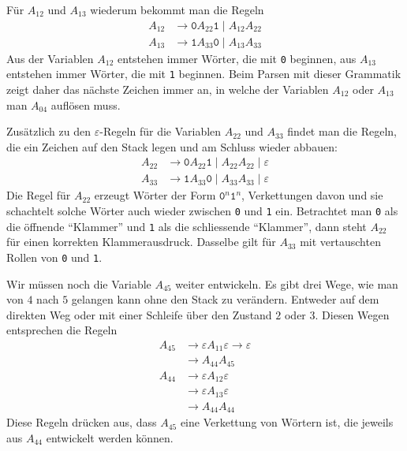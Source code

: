 \begin{loesung}
Für $A_{12}$ und $A_{13}$ wiederum bekommt man die Regeln
\begin{equation}
\begin{aligned}
A_{12}&\to\texttt{0} A_{22}\texttt{1} \;|\; A_{12}A_{22}\\
A_{13}&\to\texttt{1} A_{33}\texttt{0} \;|\; A_{13}A_{33}
\end{aligned}
\label{40000041:a12a13}
\end{equation}
Aus der Variablen $A_{12}$ entstehen immer Wörter, die mit \texttt{0}
beginnen, aus $A_{13}$ entstehen immer Wörter, die mit \texttt{1}
beginnen.
Beim Parsen mit dieser Grammatik zeigt daher das nächste Zeichen
immer an, in welche der Variablen $A_{12}$ oder $A_{13}$ man $A_{04}$
auflösen muss.

Zusätzlich zu den $\varepsilon$-Regeln für die Variablen $A_{22}$ und $A_{33}$
findet man die Regeln, die ein Zeichen auf den Stack legen und am
Schluss wieder abbauen:
\begin{equation}
\begin{aligned}
A_{22}&\to \texttt{0}A_{22}\texttt{1} \;|\; A_{22}A_{22} \;|\; \varepsilon\\
A_{33}&\to \texttt{1}A_{33}\texttt{0} \;|\; A_{33}A_{33} \;|\; \varepsilon
\end{aligned}
\label{40000041:a22a33}
\end{equation}
Die Regel für $A_{22}$ erzeugt Wörter der Form
$\texttt{0}^n\texttt{1}^n$,
Verkettungen davon und sie schachtelt solche Wörter auch wieder zwischen
\texttt{0} und \texttt{1} ein.
Betrachtet man \texttt{0} als die öffnende ``Klammer'' und \texttt{1}
als die schliessende ``Klammer'', dann steht $A_{22}$ für einen
korrekten Klammerausdruck.
Dasselbe gilt für $A_{33}$ mit vertauschten Rollen von \texttt{0}
und \texttt{1}.

Wir müssen noch die Variable $A_{45}$ weiter entwickeln. Es gibt
drei Wege, wie man von $4$ nach $5$ gelangen kann ohne den
Stack zu verändern. Entweder auf dem direkten Weg oder mit
einer Schleife über den Zustand $2$ oder $3$.
Diesen Wegen entsprechen die Regeln
\begin{align*}
A_{45}&\to\varepsilon A_{11}\varepsilon\to\varepsilon\\
      &\to A_{44}A_{45}\\
A_{44}&\to\varepsilon A_{12}\varepsilon\\
      &\to\varepsilon A_{13}\varepsilon\\
      &\to A_{44}A_{44}
\end{align*}
Diese Regeln drücken aus, dass $A_{45}$ eine Verkettung von Wörtern
ist, die jeweils aus $A_{44}$ entwickelt werden können.


\end{loesung}
